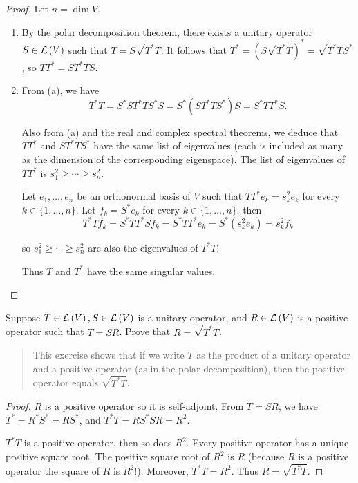 \begin{proof}
    Let $n = \dim V$.
    \begin{enumerate}[label={(\alph*)}]
        \item By the polar decomposition theorem, there exists a unitary operator $S\in\mathcal{L}\left({V}\right)$ such that $T = S\sqrt{T^{*}T}$. It follows that $T^{*} = {(S\sqrt{T^{*}T})}^{*} = \sqrt{T^{*}T}S^{*}$, so $TT^{*} = ST^{*}TS$.
        \item From (a), we have
              \[
                  T^{*}T = S^{*}ST^{*}TS^{*}S = S^{*}(ST^{*}TS^{*})S = S^{*}TT^{*}S.
              \]

              Also from (a) and the real and complex spectral theorems, we deduce that $TT^{*}$ and $ST^{*}TS^{*}$ have the same list of eigenvalues (each is included as many as the dimension of the corresponding eigenspace). The list of eigenvalues of $TT^{*}$ is $s_{1}^{2}\geq \cdots \geq s_{n}^{2}$.

              Let $e_{1}, \ldots, e_{n}$ be an orthonormal basis of $V$ such that $TT^{*}e_{k} = s_{k}^{2}e_{k}$ for every $k\in\{1,\ldots,n\}$. Let $f_{k} = S^{*}e_{k}$ for every $k\in\{1,\ldots,n\}$, then
              \[
                  T^{*}Tf_{k} = S^{*}TT^{*}Sf_{k} = S^{*}TT^{*}e_{k} = S^{*}(s_{k}^{2}e_{k}) = s_{k}^{2}f_{k}
              \]

              so $s_{1}^{2}\geq \cdots \geq s_{n}^{2}$ are also the eigenvalues of $T^{*}T$.

              Thus $T$ and $T^{*}$ have the same singular values.
    \end{enumerate}
\end{proof}
\newpage

\begin{exercise}
    Suppose $T\in\mathcal{L}\left({V}\right), S\in\mathcal{L}\left({V}\right)$ is a unitary operator, and $R\in\mathcal{L}\left({V}\right)$ is a positive operator such that $T = SR$. Prove that $R = \sqrt{T^{*}T}$.
\end{exercise}

\begin{quote}
    This exercise shows that if we write $T$ as the product of a unitary operator and a positive operator (as in the polar decomposition), then the positive operator equals $\sqrt{T^{*}T}$.
\end{quote}

\begin{proof}
    $R$ is a positive operator so it is self-adjoint. From $T = SR$, we have $T^{*} = R^{*}S^{*} = RS^{*}$, and  $T^{*}T = RS^{*}SR = R^{2}$.

    $T^{*}T$ is a positive operator, then so does $R^{2}$. Every positive operator has a unique positive square root. The positive square root of $R^{2}$ is $R$ (because $R$ is a positive operator the square of $R$ is $R^{2}$!). Moreover, $T^{*}T = R^{2}$. Thus $R = \sqrt{T^{*}T}$.
\end{proof}
\newpage

